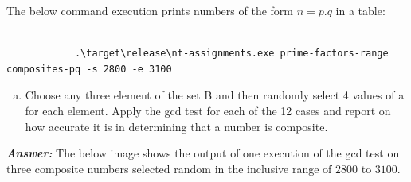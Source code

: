\documentclass[11pt,a4paper]{article}
\begin{document}
\begin{enumerate}[1.]
\begin{flushleft}
			\bigbreak
			The below command execution prints numbers of the form $n = p.q$ in a table:
			\begin{lstlisting}[style=DOS, caption=Print numbers of the form n = p.q]

			.\target\release\nt-assignments.exe prime-factors-range composites-pq -s 2800 -e 3100
			\end{lstlisting}

		\end{flushleft}

		\begin{enumerate}[(c)]
			\item Choose any three element of the set B and then randomly select 4 values of a for each element. Apply the gcd test for each of the 12 cases and report on how accurate it is in determining that a number is composite.
		\end{enumerate}
		\begin{flushleft}
			\textbf{\textit{Answer:}} The below image shows the output of one execution of the gcd test on three composite numbers selected random in the inclusive range of $2800$ to $3100$.


\end{flushleft}
\end{enumerate}
\end{document}
